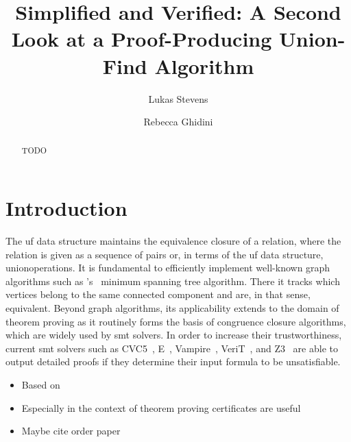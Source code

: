 \documentclass[
  sigplan,
  10pt,
  anonymous,
  review,
  ]{acmart}
\newcommand{\opunion}{union}
\begin{document}

\setcounter{tocdepth}{1}

\title{Simplified and Verified: A Second Look at a Proof-Producing Union-Find Algorithm}
\author{Lukas Stevens}

\author{Rebecca Ghidini}

\begin{abstract}
  TODO
\end{abstract}

\maketitle

\section{Introduction}
The \acrfull{uf} data structure maintains the equivalence closure of a relation, where the relation is given as a sequence of pairs or, in terms of the \acrshort{uf} data structure, \opunion operations.
It is fundamental to efficiently implement well-known graph algorithms such as \citeauthor{mst}'s~\cite{mst} minimum spanning tree algorithm. 
There it tracks which vertices belong to the same connected component and are, in that sense, equivalent.
Beyond graph algorithms, its applicability extends to the domain of theorem proving as it routinely forms the basis of congruence closure algorithms, which are widely used by \acrfull{smt} solvers.
In order to increase their trustworthiness, current \acrshort{smt} solvers such as CVC5~\cite{cvc5}, E~\cite{eprover}, Vampire~\cite{vampire}, VeriT~\cite{verit}, and Z3~\cite{z3_proofs} are able to output detailed proofs if they determine their input formula to be unsatisfiable.

\begin{itemize}
  \item Based on \cite{congcl_proofs}
  \item Especially in the context of theorem proving certificates are useful
  \item Maybe cite order paper
\end{itemize}
\end{document}
